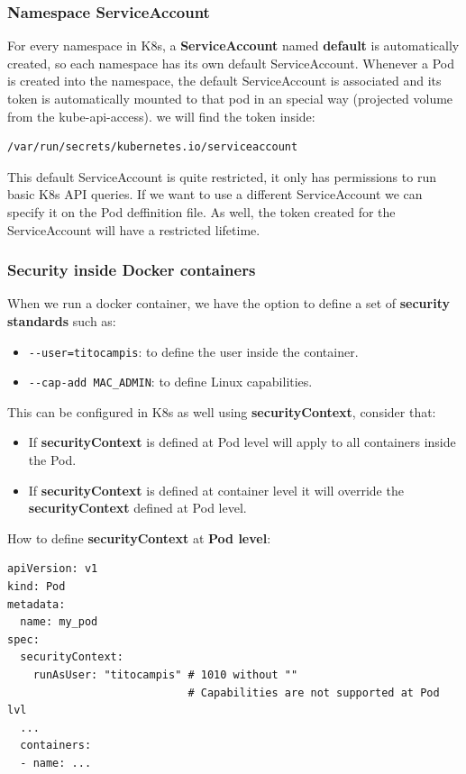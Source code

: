 \documentclass{article}
\newenvironment{codetemplate}[1][]{%
  \mybasecolorbox[#1]
  \itshape
}{%
  \endmybasecolorbox
}
\begin{document}
\subsubsection{Namespace ServiceAccount}
For every namespace in K8s, a \textbf{ServiceAccount} named \textbf{default} is automatically created, so each namespace has its own default ServiceAccount.
Whenever a Pod is created into the namespace, the default ServiceAccount is associated and its token is automatically mounted to that pod in an special way (projected volume from the kube-api-access). we will find the token inside:
\begin{codetemplate}{}
\begin{verbatim}
/var/run/secrets/kubernetes.io/serviceaccount
\end{verbatim}
\end{codetemplate}

This default ServiceAccount is quite restricted, it only has permissions to run basic K8s API queries.
If we want to use a different ServiceAccount we can specify it on the Pod deffinition file. As well, the token created
for the ServiceAccount will have a restricted lifetime.

\subsubsection{Security inside Docker containers}
When we run a docker container, we have the option to define a set of \textbf{security standards} such as:
\begin{itemize}
    \item \verb|--user=titocampis|: to define the user inside the container.
    \item \verb|--cap-add MAC_ADMIN|: to define Linux capabilities.
\end{itemize}

This can be configured in K8s as well using \textbf{securityContext}, consider that:
\begin{itemize}
    \item If \textbf{securityContext} is defined at Pod level will apply to all containers inside the Pod.
    \item If \textbf{securityContext} is defined at container level it will override the \textbf{securityContext} defined at Pod level.
\end{itemize}

How to define \textbf{securityContext} at \textbf{Pod level}:
\begin{codetemplate}{}
\begin{verbatim}
apiVersion: v1
kind: Pod
metadata:
  name: my_pod
spec:
  securityContext:
    runAsUser: "titocampis" # 1010 without ""
                            # Capabilities are not supported at Pod lvl
  ...
  containers:
  - name: ...
\end{verbatim}
\end{codetemplate}
\end{document}
